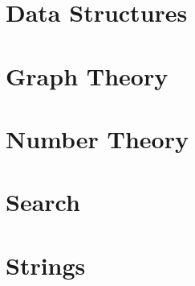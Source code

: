 \documentclass[twocolumn]{article}
\begin{document}
	\section{Data Structures}
	\section{Graph Theory}
	\section{Number Theory}
		
		
	\section{Search}
		
	\section{Strings}
\end{document}
